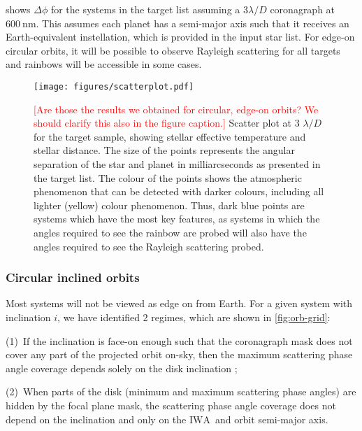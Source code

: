 \documentclass[
    usenatbib,
]{mnras}
\newcommand{\todo}[1]{\textcolor{red}{[#1]}}
\newcommand{\IWA}{\ensuremath{\mathrm{IWA}}}
\begin{document}
 shows $\Delta \phi$ for the systems in the target list assuming a $3 \lambda / D$ coronagraph at $\SI{600}{\nano\meter}$. 
%
This assumes each planet has a semi-major axis such that it receives an Earth-equivalent instellation, which is provided in the input star list.
%
For edge-on circular orbits, it will be possible to observe Rayleigh scattering for all targets and rainbows will be accessible in some cases.

\begin{figure*}
    \centering
    \texttt{[image: figures/scatterplot.pdf]}
    \caption{
        \todo{Are those the results we obtained for circular, edge-on orbits? 
        We should clarify this also in the figure caption.}
        Scatter plot at 3 $\lambda/D$ for the target sample, showing stellar effective temperature and stellar distance. 
        The size of the points represents the angular separation of the star and planet in milliarcseconds as presented in the target list. 
        The colour of the points shows the atmospheric phenomenon that can be detected with darker colours, including all lighter (yellow) colour phenomenon. 
        Thus, dark blue points are systems which have the most key features, as systems in which the angles required to see the rainbow are probed will also have the angles required to see the Rayleigh scattering probed.
    }
    \label{fig:scatterplot}
\end{figure*}


\subsubsection{Circular inclined orbits}

Most systems will not be viewed as edge on from Earth.
%
For a given system with inclination $i$, we have identified 2 regimes, which are shown in \cref{fig:orb-grid}:

(1)~If the inclination is face-on enough such that the coronagraph mask does not cover any part of the projected orbit on-sky, then the maximum scattering phase angle coverage depends solely on the disk inclination ;

(2)~When parts of the disk (minimum and maximum scattering phase angles) are hidden by the focal plane mask, the scattering phase angle coverage does not depend on the inclination and only on the \IWA\ and orbit semi-major axis. 
\end{document}
